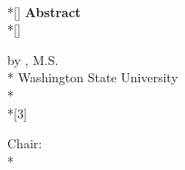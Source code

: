 %

\newpage
\begin{center}
    \begin{doublespace}
        {\Large \textbf{\covertitle}}\\*[\baselineskip]
        {\Large \textbf{Abstract}}\\*[\baselineskip]
    \end{doublespace}
    \begin{singlespace}
	    by \paperauthor, M.S.\\*
	    Washington State University\\*
	    \papermonth~\paperyear\\*[3\baselineskip]
	  \end{singlespace}
\end{center}
\noindent Chair: \chairname\\*
\par
{}

